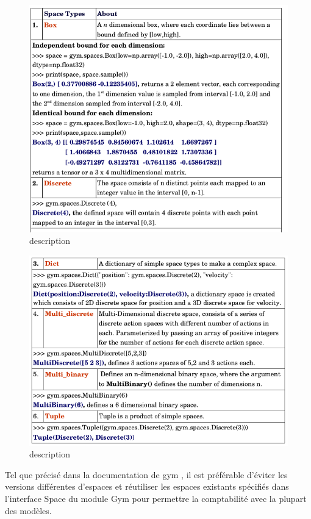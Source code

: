 \documentclass[11pt, a4paper]{article}
\begin{document}
\begin{figure}[H]
    \centering
    \includegraphics[scale=0.5]{../images/space1.png}
    \caption {description}
\end{figure}

\begin{figure}[H]
    \centering
    \includegraphics[scale=0.5]{../images/space2.png}
    \caption {description}
\end{figure}

\noindent Tel que précisé dans la documentation de gym , il est préférable d'éviter les versions différentes d'espaces et réutiliser les espaces existants spécifiés dans l'interface Space du module Gym pour permettre 
la comptabilité avec la plupart des modèles. \\
\end{document}
